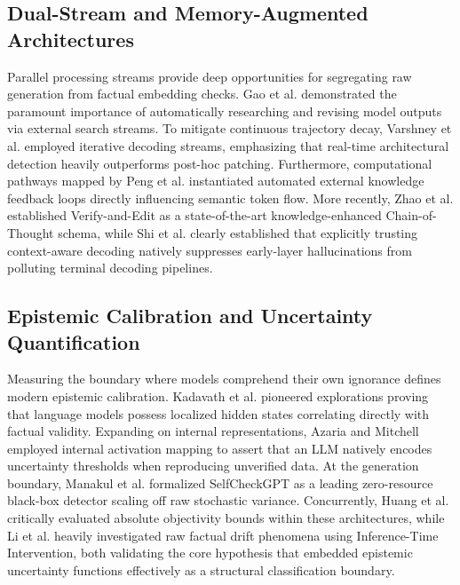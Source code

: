 \documentclass[11pt,a4paper]{article}
\begin{document}
\subsection{Dual-Stream and Memory-Augmented Architectures}
Parallel processing streams provide deep opportunities for segregating raw generation from factual embedding checks. Gao et al. \cite{ref24} demonstrated the paramount importance of automatically researching and revising model outputs via external search streams. To mitigate continuous trajectory decay, Varshney et al. \cite{ref21} employed iterative decoding streams, emphasizing that real-time architectural detection heavily outperforms post-hoc patching. Furthermore, computational pathways mapped by Peng et al. \cite{ref20} instantiated automated external knowledge feedback loops directly influencing semantic token flow. More recently, Zhao et al. \cite{ref19} established Verify-and-Edit as a state-of-the-art knowledge-enhanced Chain-of-Thought schema, while Shi et al. \cite{ref25} clearly established that explicitly trusting context-aware decoding natively suppresses early-layer hallucinations from polluting terminal decoding pipelines.

\subsection{Epistemic Calibration and Uncertainty Quantification}
Measuring the boundary where models comprehend their own ignorance defines modern epistemic calibration. Kadavath et al. \cite{ref9} pioneered explorations proving that language models possess localized hidden states correlating directly with factual validity. Expanding on internal representations, Azaria and Mitchell \cite{ref10} employed internal activation mapping to assert that an LLM natively encodes uncertainty thresholds when reproducing unverified data. At the generation boundary, Manakul et al. \cite{ref11} formalized SelfCheckGPT as a leading zero-resource black-box detector scaling off raw stochastic variance. Concurrently, Huang et al. \cite{ref17} critically evaluated absolute objectivity bounds within these architectures, while Li et al. \cite{ref18} heavily investigated raw factual drift phenomena using Inference-Time Intervention, both validating the core hypothesis that embedded epistemic uncertainty functions effectively as a structural classification boundary.
\end{document}
